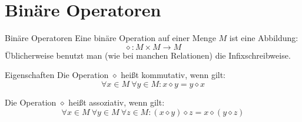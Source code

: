 \section{Binäre Operatoren}
\begin{frame}
	\begin{block}{Binäre Operatoren}
		Eine binäre Operation auf einer Menge $M$ ist eine Abbildung:
		\[ \diamond: M \times M \to M \]
		Üblicherweise benutzt man (wie bei manchen Relationen) die Infixschreibweise.
	\end{block} \pause
	\begin{block}{Eigenschaften}
		Die Operation $\diamond$ heißt kommutativ, wenn gilt:
		\[ \forall x \in M \ \forall y \in M: x \diamond y = y \diamond x \]
		
		Die Operation $\diamond$ heißt assoziativ, wenn gilt:
		\[ \forall x \in M \ \forall y \in M \ \forall z \in M : (x \diamond y) \diamond z = x \diamond (y \diamond z) \]
	\end{block} \pause


\end{frame}